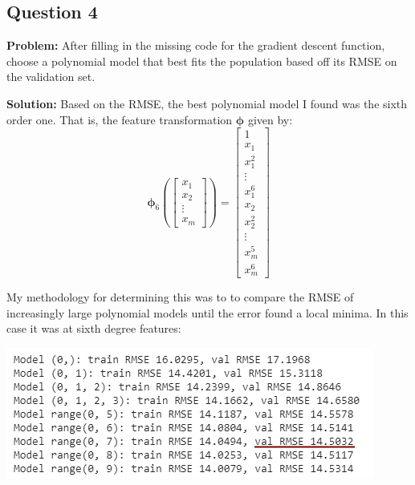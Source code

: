 \documentclass{article}
\renewcommand{\vec}[1]{\mathbf{#1}}
\begin{document}
\newpage

\subsection*{Question 4}
\noindent\textbf{Problem:} After filling in the missing code for the gradient descent function, choose a polynomial model that best fits the population based off its RMSE on the validation set.
\smallskip

\noindent\textbf{Solution:} Based on the RMSE, the best polynomial model I found was the sixth order one. That is, the feature transformation $\bm{\phi}$ given by:
$$\bm{\phi}_6\left(\begin{bmatrix}
    x_{1} \\
    x_{2} \\
    \vdots \\
    x_{m}
  \end{bmatrix}\right)=\begin{bmatrix}
    1\\
    x_{1} \\
    x_{1}^2 \\
    \vdots \\
    x_{1}^6 \\
    x_{2} \\
    x_{2}^2 \\
    \vdots \\
    x_{m}^5\\
    x_{m}^6
  \end{bmatrix}$$
\bigskip

My methodology for determining this was to to compare the RMSE of increasingly large polynomial models until the error found a local minima. In this case it was at sixth degree features:
\begin{center}
    \includegraphics[scale=.95]{fig1.png}  
\end{center}
\end{document}
